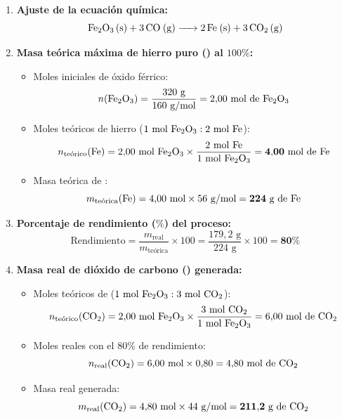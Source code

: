 ﻿\documentclass[11pt,a4paper]{article}
\begin{document}
\vspace{0.2cm}
\begin{enumerate}[label=\textbf{\alph*)}, leftmargin=2em, itemsep=10pt]
    \item \textbf{Ajuste de la ecuación química:}
    \[
    \ce{Fe2O3 (s) + 3 CO (g) -> 2 Fe (s) + 3 CO2 (g)}
    \]

    \item \textbf{Masa teórica máxima de hierro puro () al $100\%$:}
    \begin{itemize}[leftmargin=1.5em, itemsep=3pt]
        \item Moles iniciales de óxido férrico:
        \[
        n(\ce{Fe2O3}) = \frac{320\text{ g}}{160\text{ g/mol}} = 2{,}00\text{ mol de \ce{Fe2O3}}
        \]
        \item Moles teóricos de hierro ($1\text{ mol \ce{Fe2O3}} : 2\text{ mol \ce{Fe}}$):
        \[
        n_{\text{teórico}}(\ce{Fe}) = 2{,}00\text{ mol \ce{Fe2O3}} \times \frac{2\text{ mol \ce{Fe}}}{1\text{ mol \ce{Fe2O3}}} = \mathbf{4{,}00\text{ mol de \ce{Fe}}}
        \]
        \item Masa teórica de :
        \[
        m_{\text{teórica}}(\ce{Fe}) = 4{,}00\text{ mol} \times 56\text{ g/mol} = \mathbf{224\text{ g de \ce{Fe}}}
        \]
    \end{itemize}

    \item \textbf{Porcentaje de rendimiento ($\%$) del proceso:}
    \[
    \text{Rendimiento} = \frac{m_{\text{real}}}{m_{\text{teórica}}} \times 100 = \frac{179{,}2\text{ g}}{224\text{ g}} \times 100 = \mathbf{80\%}
    \]

    \item \textbf{Masa real de dióxido de carbono () generada:}
    \begin{itemize}[leftmargin=1.5em, itemsep=3pt]
        \item Moles teóricos de  ($1\text{ mol \ce{Fe2O3}} : 3\text{ mol \ce{CO2}}$):
        \[
        n_{\text{teórico}}(\ce{CO2}) = 2{,}00\text{ mol \ce{Fe2O3}} \times \frac{3\text{ mol \ce{CO2}}}{1\text{ mol \ce{Fe2O3}}} = 6{,}00\text{ mol de \ce{CO2}}
        \]
        \item Moles reales con el $80\%$ de rendimiento:
        \[
        n_{\text{real}}(\ce{CO2}) = 6{,}00\text{ mol} \times 0{,}80 = 4{,}80\text{ mol de \ce{CO2}}
        \]
        \item Masa real generada:
        \[
        m_{\text{real}}(\ce{CO2}) = 4{,}80\text{ mol} \times 44\text{ g/mol} = \mathbf{211{,}2\text{ g de \ce{CO2}}}
        \]
    \end{itemize}
\end{enumerate}
\end{document}
